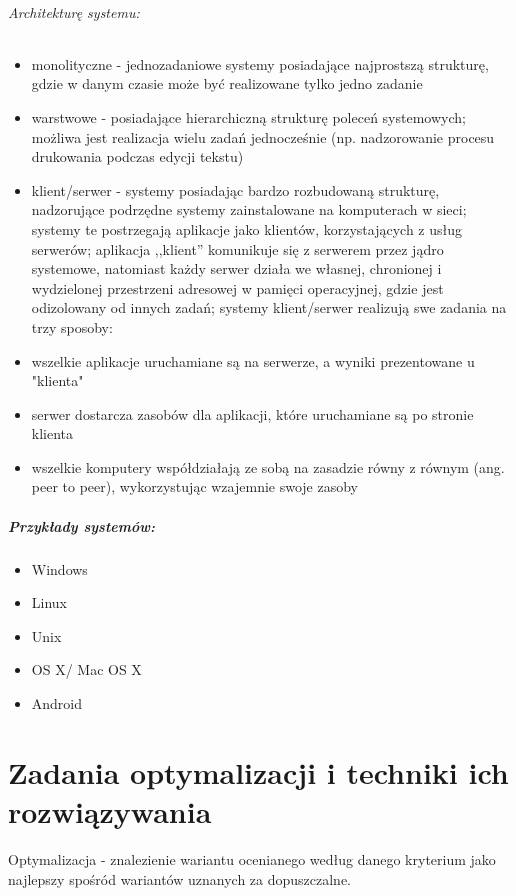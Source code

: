 \documentclass[a4paper,twoside]{report}
\begin{document}
\subparagraph{Architekturę systemu:}
\begin{itemize}

\item monolityczne - jednozadaniowe systemy posiadające najprostszą strukturę, gdzie w danym czasie może być realizowane tylko jedno zadanie
\item warstwowe - posiadające hierarchiczną strukturę poleceń systemowych; możliwa jest realizacja wielu zadań jednocześnie (np. nadzorowanie procesu drukowania podczas edycji tekstu)
\item klient/serwer - systemy posiadając bardzo rozbudowaną strukturę, nadzorujące podrzędne systemy zainstalowane na komputerach w sieci; systemy te postrzegają aplikacje jako klientów, korzystających z usług serwerów; aplikacja ,,klient'' komunikuje się z serwerem przez jądro systemowe, natomiast każdy serwer działa we własnej, chronionej i wydzielonej przestrzeni adresowej w pamięci operacyjnej, gdzie jest odizolowany od innych zadań; systemy klient/serwer realizują swe zadania na trzy sposoby:
\item wszelkie aplikacje uruchamiane są na serwerze, a wyniki prezentowane u "klienta"
\item serwer dostarcza zasobów dla aplikacji, które uruchamiane są po stronie klienta
\item wszelkie komputery współdziałają ze sobą na zasadzie równy z równym (ang. peer to peer), wykorzystując wzajemnie swoje zasoby
\end{itemize}

\paragraph{Przykłady systemów:}
\begin{itemize}
\item Windows
\item Linux
\item Unix
\item OS X/ Mac OS X
\item Android
\end{itemize}

\chapter{Zadania optymalizacji i techniki ich rozwiązywania}

Optymalizacja - znalezienie wariantu ocenianego według danego kryterium jako najlepszy spośród wariantów uznanych za dopuszczalne.
\end{document}
